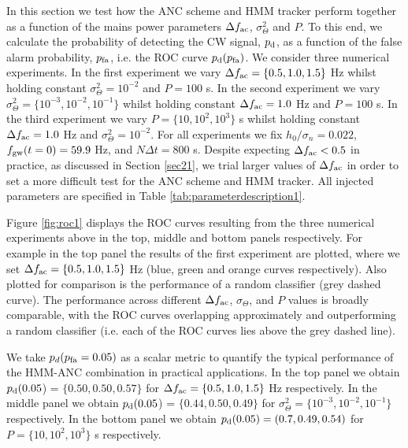 \documentclass[pra,superscriptaddress,reprint,amsmath,amssymb,nofootinbib]{revtex4-2}
\begin{document}
In this section we test how the ANC scheme and HMM tracker perform together as a function of the mains power parameters $\Delta f_{\rm ac}$, $\sigma_\Theta^2$ and $P$. To this end, we calculate the probability of detecting the CW signal, $p_{\rm d}$, as a function of the false alarm probability, $p_{\rm fa}$, i.e. the ROC curve $p_{\rm d} (p_{\rm fa})$. We consider three numerical experiments. In the first experiment we vary $\Delta f_{\rm ac} =  \{0.5, 1.0, 1.5\}$ Hz whilst holding constant $\sigma_{\Theta}^2 = 10^{-2}$ and $P = 100 $ s. In the second experiment we vary $\sigma_{\Theta}^2 =  \{ 10^{-3}, 10^{-2}, 10^{-1}\}$ whilst holding constant $\Delta f_{\rm ac} = 1.0$ Hz and $P = 100 $ s. In the third experiment we vary $P=  \{ 10, 10^2, 10^3\}$ s whilst holding constant $\Delta f_{\rm ac} = 1.0$ Hz and $\sigma_{\Theta}^2 = 10^{-2}$. For all experiments we fix $h_0 / \sigma_n = 0.022$, $f_{\rm gw}(t=0) = 59.9$ Hz, and $N \Delta t = 800$ s. Despite expecting $\Delta f_{\rm ac} < 0.5$ in practice, as discussed in Section \ref{sec21}, we trial larger values of $\Delta f_{\rm ac}$ in order to set a more difficult test for the ANC scheme and HMM tracker. All injected parameters are specified in Table \ref{tab:parameterdescription1}. \newline 


Figure \ref{fig:roc1} displays the ROC curves resulting from the three numerical experiments above in the top, middle and bottom panels respectively. For example in the top panel the results of the first experiment are plotted, where we set  $\Delta f_{\rm ac} = \{0.5, 1.0, 1.5\}$ Hz (blue, green and orange curves respectively). Also plotted for comparison is the performance of a random classifier (grey dashed curve). The performance across different $\Delta f_{\rm ac}$, $\sigma_\Theta$, and $P$ values is broadly comparable, with the ROC curves overlapping approximately and outperforming a random classifier (i.e. each of the ROC curves lies above the grey dashed line). \newline 


We take $p_{d}(p_{\rm fa} =0.05)$ as a scalar metric to quantify the typical performance of the HMM-ANC combination in practical applications. In the top panel we obtain $p_{\rm d}(0.05$) = $ \{0.50, 0.50, 0.57 \}$ for $\Delta f_{\rm ac} =  \{0.5, 1.0, 1.5\}$ Hz respectively. In the middle panel we obtain $p_{\rm d}(0.05$) = $ \{0.44,0.50,0.49 \}$ for $\sigma_{\Theta}^2 =  \{ 10^{-3}, 10^{-2}, 10^{-1}\}$ respectively. In the bottom panel we obtain $p_{\rm d}(0.05) = (0.7,0.49,0.54)$ for $P=  \{ 10, 10^2, 10^3\}$ s respectively.
\end{document}

